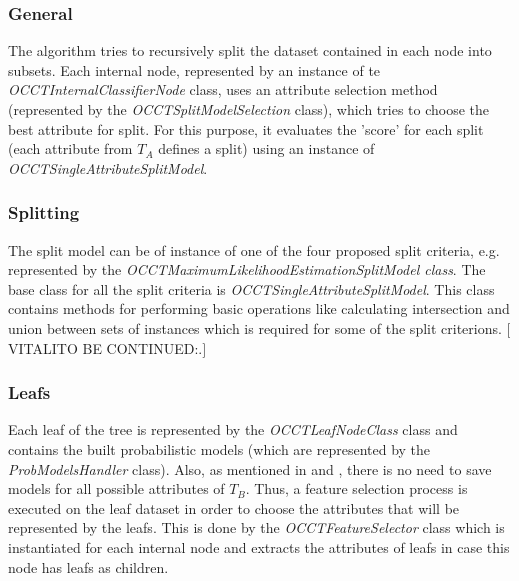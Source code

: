 \documentclass[a4paper,12pt]{article}
\newcommand{\commenter}[3]{$[$\uppercase{#1}#2:#3$]$  \\}
\newcommand{\vitali}[2]{\commenter{vitali}{#1}{#2}}
\begin{document}
\begin{spacing}{1.5}
\subsubsection{General}
The algorithm tries to recursively split the dataset contained in each node into subsets. Each internal node, represented by an instance of te {\em OCCTInternalClassifierNode} class, uses an attribute selection method (represented by the {\em OCCTSplitModelSelection} class), which tries to choose the best attribute for split. For this purpose, it evaluates the 'score' for each split (each attribute from $T_A$ defines a split) using an instance of {\em OCCTSingleAttributeSplitModel}.


\subsubsection{Splitting}
The split model can be of instance of one of the four proposed split criteria, e.g. represented by the {\em OCCTMaximumLikelihoodEstimationSplitModel class}. The base class for all the split criteria is {\em OCCTSingleAttributeSplitModel}. This class contains methods for performing basic operations like calculating intersection and union between sets of instances which is required for some of the split criterions. \vitali{TO BE CONTINUED}.

\subsubsection{Leafs}
Each leaf of the tree is represented by the {\em OCCTLeafNodeClass} class and contains the built probabilistic models (which are represented by the {\em ProbModelsHandler} class). Also, as mentioned in \cite{dror2011thesis} and \cite{dror2014occt}, there is no need to save models for all possible attributes of $T_B$. Thus, a feature selection process is executed on the leaf dataset in order to choose the attributes that will be represented by the leafs. This is done by the {\em OCCTFeatureSelector} class which is instantiated for each internal node and extracts the attributes of leafs in case this node has leafs as children.



\clearpage

\end{spacing}
\end{document}
